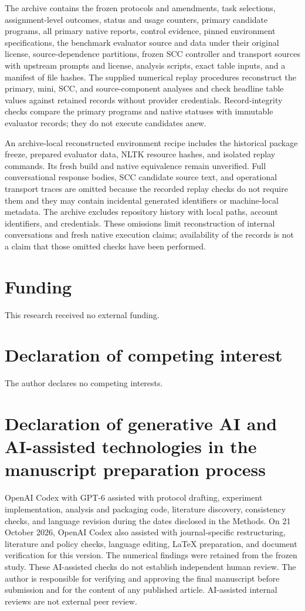 The archive contains the frozen protocols and amendments, task selections, assignment-level outcomes, status and usage counters, primary candidate programs, all primary native reports, control evidence, pinned environment specifications, the benchmark evaluator source and data under their original license, source-dependence partitions, frozen SCC controller and transport sources with upstream prompts and license, analysis scripts, exact table inputs, and a manifest of file hashes. The supplied numerical replay procedures reconstruct the primary, mini, SCC, and source-component analyses and check headline table values against retained records without provider credentials. Record-integrity checks compare the primary programs and native statuses with immutable evaluator records; they do not execute candidates anew.

An archive-local reconstructed environment recipe includes the historical package freeze, prepared evaluator data, NLTK resource hashes, and isolated replay commands. Its fresh build and native equivalence remain unverified. Full conversational response bodies, SCC candidate source text, and operational transport traces are omitted because the recorded replay checks do not require them and they may contain incidental generated identifiers or machine-local metadata. The archive excludes repository history with local paths, account identifiers, and credentials. These omissions limit reconstruction of internal conversations and fresh native execution claims; availability of the records is not a claim that those omitted checks have been performed.

\section*{Funding}
This research received no external funding.

\section*{Declaration of competing interest}
The author declares no competing interests.

\section*{Declaration of generative AI and AI-assisted technologies in the manuscript preparation process}
OpenAI Codex with GPT-6 assisted with protocol drafting, experiment implementation, analysis and packaging code, literature discovery, consistency checks, and language revision during the dates disclosed in the Methods. On 21 October 2026, OpenAI Codex also assisted with journal-specific restructuring, literature and policy checks, language editing, LaTeX preparation, and document verification for this version. The numerical findings were retained from the frozen study. These AI-assisted checks do not establish independent human review. The author is responsible for verifying and approving the final manuscript before submission and for the content of any published article. AI-assisted internal reviews are not external peer review.

